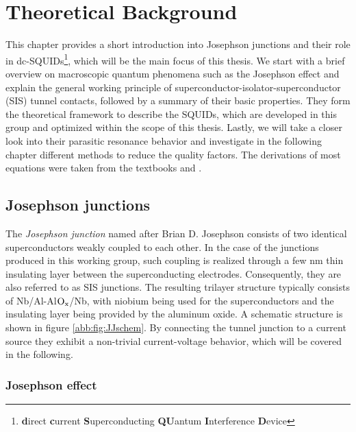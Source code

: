 \chapter{Theoretical Background}

This chapter provides a short introduction into Josephson junctions and their role in dc-SQUIDs\footnote{\textbf{d}irect \textbf{c}urrent \textbf{S}uperconducting \textbf{QU}antum \textbf{I}nterference \textbf{D}evice}, which will be the main focus of this thesis. We start with a brief overview on macroscopic quantum phenomena such as the Josephson effect and explain the general working principle of superconductor-isolator-superconductor (SIS) tunnel contacts, followed by a summary of their basic properties. They form the theoretical framework to describe the SQUIDs, which are developed in this group and optimized within the scope of this thesis. Lastly, we will take a closer look into their parasitic resonance behavior and investigate in the following chapter different methods to reduce the quality factors.   The derivations of most equations were taken from the textbooks \cite{Clarke2004} and \cite{Gross2016}.

\section{Josephson junctions}


The \textit{Josephson junction} named after Brian D. Josephson consists of two identical superconductors weakly coupled to each other. In the case of the junctions produced in this working group, such coupling is realized through a few nm thin insulating layer between the superconducting electrodes. Consequently, they are also referred to as SIS junctions. The resulting trilayer structure typically consists of Nb/Al-Al$\rm O_x$/Nb, with niobium being used for the superconductors and the insulating layer being provided by the aluminum oxide. A schematic structure is shown in figure \ref{abb:fig:JJschem}. %
By connecting the tunnel junction to a current source they exhibit a non-trivial current-voltage behavior, which will be covered in the following. 

        
\subsection{Josephson effect}\label{subchap_Jeffect}

